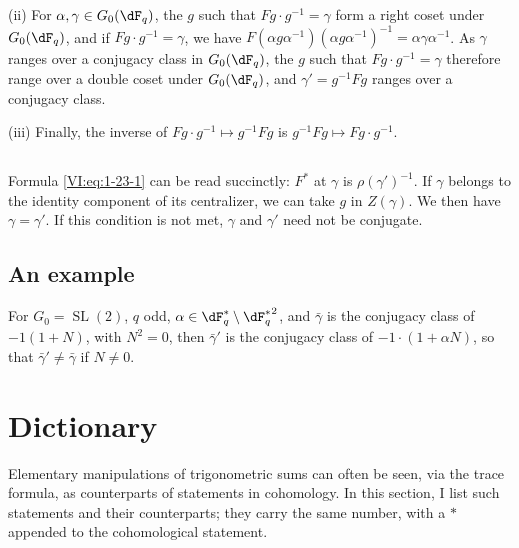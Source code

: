 (ii) For $\alpha,\gamma\in G_0(\dF_q)$, the $g$ such that 
$F g\cdot g^{-1} = \gamma$ form a right coset under $G_0(\dF_q)$, and 
if $F g\cdot g^{-1} = \gamma$, we have 
$F(\alpha g \alpha^{-1})(\alpha g \alpha^{-1})^{-1} = \alpha \gamma\alpha^{-1}$. 
As $\gamma$ ranges over a conjugacy class in $G_0(\dF_q)$, the $g$ 
such that $F g\cdot g^{-1} = \gamma$ therefore range over a double coset under 
$G_0(\dF_q)$, and $\gamma'= g^{-1} F g$ ranges over a conjugacy class. 

(iii) Finally, the inverse of $F g\cdot g^{-1}\mapsto g^{-1} F g$ is 
$g^{-1} F g\mapsto F g\cdot g^{-1}$. 





\subsection{}\label{VI:1-25}

Formula \eqref{VI:eq:1-23-1} can be read succinctly: $F^\ast$ at 
$\gamma$ is $\rho(\gamma')^{-1}$. If $\gamma$ belongs to the identity component 
of its centralizer, we can take $g$ in $Z(\gamma)$. We then have 
$\gamma=\gamma'$. If this condition is not met, $\gamma$ and $\gamma'$ 
need not be conjugate. 





\subsection{An example}\label{VI:1-26}

For $G_0=\operatorname{SL}(2)$, $q$ odd, 
$\alpha\in \dF_q^\ast\setminus {\dF_q^\ast}^2$, and $\bar\gamma$ is the 
conjugacy class of $-1(1+N)$, with $N^2=0$, then $\bar\gamma'$ is the 
conjugacy class of $-1\cdot (1+\alpha N)$, so that $\bar\gamma'\ne \bar\gamma$ 
if $N\ne 0$. 










\section{Dictionary}\label{VI:2}

Elementary manipulations of trigonometric sums can often 
be seen, via the trace formula, as counterparts of statements 
in cohomology. In this section, I list such statements and their 
counterparts; they carry the same number, with a $\ast$ appended to 
the cohomological statement. 





